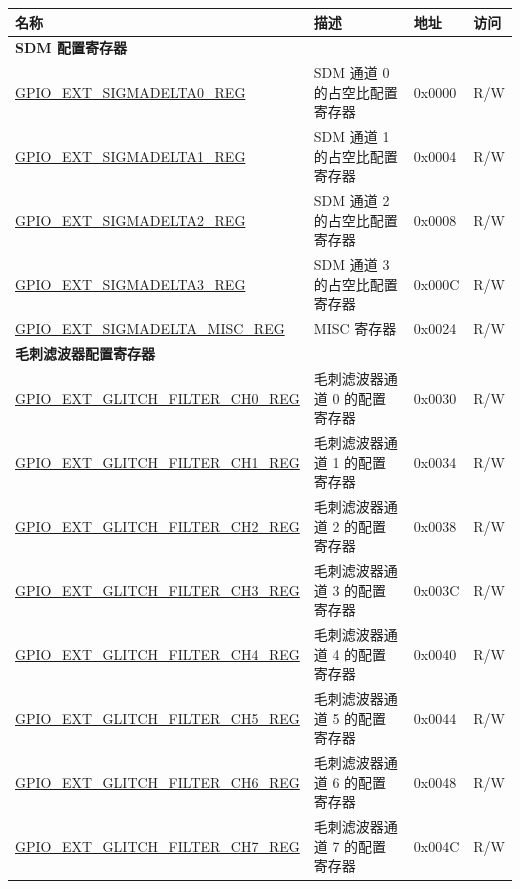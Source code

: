 
\begin{longtable}{ | p{6.2cm} | p{7.0cm} | p{1.3cm} | p{1cm} | }
\hline\rowcolor{lightgray}
\textbf{名称} & \textbf{描述} & \textbf{地址} & \textbf{访问} \\ \hline
\endhead
\multicolumn{4}{|l|}{\textbf{SDM 配置寄存器}} \\ \hline
\hyperref[regdesc:GPIOSDSIGMADELTANREG]{GPIO\_EXT\_SIGMADELTA0\_REG} & SDM 通道 0 的占空比配置寄存器 & 0x0000 & R/W \\ \hline
\hyperref[regdesc:GPIOSDSIGMADELTANREG]{GPIO\_EXT\_SIGMADELTA1\_REG} & SDM 通道 1 的占空比配置寄存器 & 0x0004 & R/W \\ \hline
\hyperref[regdesc:GPIOSDSIGMADELTANREG]{GPIO\_EXT\_SIGMADELTA2\_REG} & SDM 通道 2 的占空比配置寄存器 & 0x0008 & R/W \\ \hline
\hyperref[regdesc:GPIOSDSIGMADELTANREG]{GPIO\_EXT\_SIGMADELTA3\_REG} & SDM 通道 3 的占空比配置寄存器 & 0x000C & R/W \\ \hline
\hyperref[regdesc:GPIOSDSIGMADELTAMISCREG]{GPIO\_EXT\_SIGMADELTA\_MISC\_REG} & MISC 寄存器 & 0x0024 & R/W \\ \hline
\multicolumn{4}{|l|}{\textbf{毛刺滤波器配置寄存器}} \\ \hline
\hyperref[regdesc:GPIOSDGLITCHFILTERCHNREG]{GPIO\_EXT\_GLITCH\_FILTER\_CH0\_REG} & 毛刺滤波器通道 0 的配置寄存器 & 0x0030 & R/W \\ \hline
\hyperref[regdesc:GPIOSDGLITCHFILTERCHNREG]{GPIO\_EXT\_GLITCH\_FILTER\_CH1\_REG} & 毛刺滤波器通道 1 的配置寄存器 & 0x0034 & R/W \\ \hline
\hyperref[regdesc:GPIOSDGLITCHFILTERCHNREG]{GPIO\_EXT\_GLITCH\_FILTER\_CH2\_REG} & 毛刺滤波器通道 2 的配置寄存器 & 0x0038 & R/W \\ \hline
\hyperref[regdesc:GPIOSDGLITCHFILTERCHNREG]{GPIO\_EXT\_GLITCH\_FILTER\_CH3\_REG} & 毛刺滤波器通道 3 的配置寄存器 & 0x003C & R/W \\ \hline
\hyperref[regdesc:GPIOSDGLITCHFILTERCHNREG]{GPIO\_EXT\_GLITCH\_FILTER\_CH4\_REG} & 毛刺滤波器通道 4 的配置寄存器 & 0x0040 & R/W \\ \hline
\hyperref[regdesc:GPIOSDGLITCHFILTERCHNREG]{GPIO\_EXT\_GLITCH\_FILTER\_CH5\_REG} & 毛刺滤波器通道 5 的配置寄存器 & 0x0044 & R/W \\ \hline
\hyperref[regdesc:GPIOSDGLITCHFILTERCHNREG]{GPIO\_EXT\_GLITCH\_FILTER\_CH6\_REG} & 毛刺滤波器通道 6 的配置寄存器 & 0x0048 & R/W \\ \hline
\hyperref[regdesc:GPIOSDGLITCHFILTERCHNREG]{GPIO\_EXT\_GLITCH\_FILTER\_CH7\_REG} & 毛刺滤波器通道 7 的配置寄存器 & 0x004C & R/W \\ \hline

\end{longtable}
